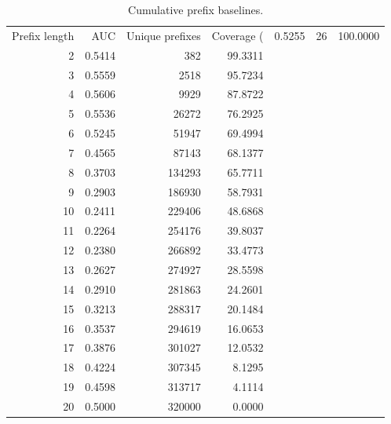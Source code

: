 \begin{table}
\caption{Cumulative prefix baselines.}
\label{tab:prefix_baselines}
\begin{tabular}{rrrr}
\toprule
Prefix length & AUC & Unique prefixes & Coverage (%
 & 0.5255 & 26 & 100.0000 \\
2 & 0.5414 & 382 & 99.3311 \\
3 & 0.5559 & 2518 & 95.7234 \\
4 & 0.5606 & 9929 & 87.8722 \\
5 & 0.5536 & 26272 & 76.2925 \\
6 & 0.5245 & 51947 & 69.4994 \\
7 & 0.4565 & 87143 & 68.1377 \\
8 & 0.3703 & 134293 & 65.7711 \\
9 & 0.2903 & 186930 & 58.7931 \\
10 & 0.2411 & 229406 & 48.6868 \\
11 & 0.2264 & 254176 & 39.8037 \\
12 & 0.2380 & 266892 & 33.4773 \\
13 & 0.2627 & 274927 & 28.5598 \\
14 & 0.2910 & 281863 & 24.2601 \\
15 & 0.3213 & 288317 & 20.1484 \\
16 & 0.3537 & 294619 & 16.0653 \\
17 & 0.3876 & 301027 & 12.0532 \\
18 & 0.4224 & 307345 & 8.1295 \\
19 & 0.4598 & 313717 & 4.1114 \\
20 & 0.5000 & 320000 & 0.0000 \\
\bottomrule
\end{tabular}
\end{table}
